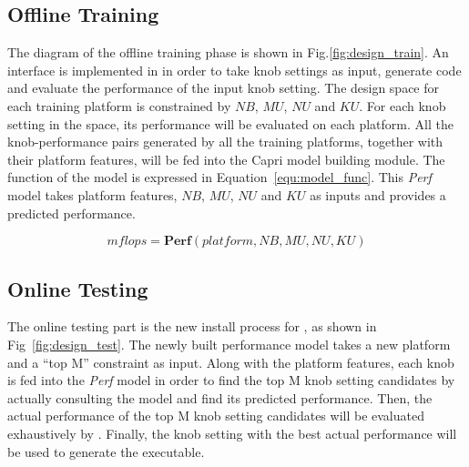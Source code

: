   \subsection{Offline Training}
  \label{sec:offline_training}
  The diagram of the offline training phase is shown in
  Fig.\ref{fig:design_train}. An interface is implemented in \atl in order to
  take knob settings as input, generate code and evaluate the performance of
  the input knob setting. The design space for each training platform is
  constrained by $NB$, $MU$, $NU$ and $KU$. For each knob setting in the space,
  its performance will be evaluated on each platform. All the knob-performance
  pairs generated by all the training platforms, together with their platform
  features, will be fed into the Capri model building module. The function of
  the model is expressed in Equation~\ref{equ:model_func}. This \emph{Perf}
  model takes platform features, $NB$, $MU$, $NU$ and $KU$ as inputs and
  provides a predicted performance.

  \begin{equation}
  \label{equ:model_func}
  mflops = \textbf{Perf}{(platform, NB, MU, NU, KU)}
  \end{equation}

  \subsection{Online Testing}
  \label{sec:online_testing}
  The online testing part is the new install process for \atl, as shown in
  Fig~\ref{fig:design_test}. The newly built performance model takes a new
  platform and a ``top M'' constraint as input. Along with the platform
  features, each knob is fed into the \emph{Perf} model in order to find the
  top M knob setting candidates by actually consulting the model and find its
  predicted performance. Then, the actual performance of the top M
  knob setting candidates will be evaluated exhaustively by \atl. Finally,
  the knob setting with the best actual performance will be used to
  generate the executable.

